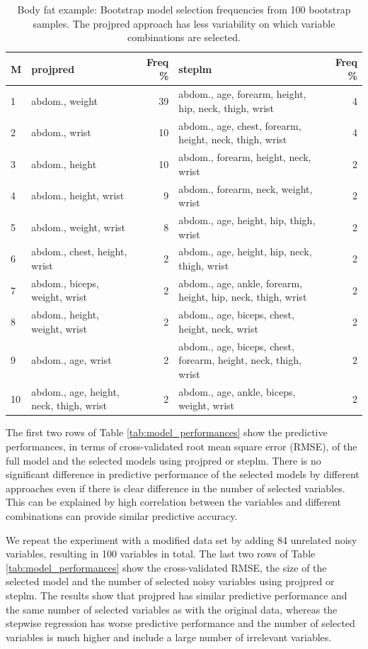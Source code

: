 \documentclass[a4]{article}
\theoremstyle{definition}
\begin{document}
\begin{table}[tp]
\footnotesize
\centering
\begin{tabular}{l|lr|lr}
M & projpred & Freq \% & steplm & Freq \%  \\ 
  \hline
1 & abdom., weight & 39 & abdom., age, forearm, height, hip, neck, thigh, wrist & 4 \\
2 & abdom., wrist & 10 & abdom., age, chest, forearm, height, neck, thigh, wrist & 4 \\
3 & abdom., height & 10 & abdom., forearm, height, neck, wrist & 2 \\
4 & abdom., height, wrist & 9 & abdom., forearm, neck, weight, wrist & 2 \\
5 & abdom., weight, wrist & 8 & abdom., age, height, hip, thigh, wrist & 2 \\
6 & abdom., chest, height, wrist & 2 & abdom., age, height, hip, neck, thigh, wrist & 2 \\
7 & abdom., biceps, weight, wrist & 2 & abdom., age, ankle, forearm, height, hip, neck, thigh, wrist & 2 \\
8 & abdom., height, weight, wrist & 2 & abdom., age, biceps, chest, height, neck, wrist & 2 \\
9 & abdom., age, wrist & 2 & abdom., age, biceps, chest, forearm, height, neck, thigh, wrist & 2 \\
10 & abdom., age, height, neck, thigh, wrist & 2 & abdom., age, ankle, biceps, weight, wrist & 2 \\
\end{tabular}
\caption{Body fat example: Bootstrap model selection frequencies from 100 bootstrap samples.  The projpred approach has less variability on which variable combinations are selected.}
\label{tab:model_frequencies}
\end{table}


The first two rows of Table \ref{tab:model_performances} show the
predictive performances, in terms of cross-validated root mean square
error (RMSE), of the full model and the selected models using projpred
or steplm.  There is no significant difference in predictive performance
of the selected models by different approaches even if there is
clear difference in the number of selected variables. This can be explained by high
correlation between the variables and different combinations can
provide similar predictive accuracy.

We repeat the experiment with a modified data set by adding 84
unrelated noisy variables, resulting in 100 variables in total. 
The last two rows of Table
\ref{tab:model_performances} show the cross-validated RMSE, the size
of the selected model and the number of selected noisy variables using
projpred or steplm. The results show that projpred has similar
predictive performance and the same number of selected variables as
with the original data, whereas the stepwise regression has worse
predictive performance and the number of selected variables is much
higher and include a large number of irrelevant variables.
\end{document}
